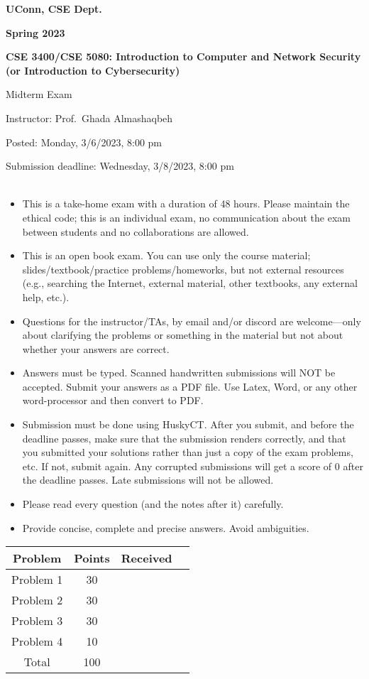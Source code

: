 \documentclass[12pt]{article}
\newcommand{\handout}[2]{
\renewcommand{\thepage}{\footnotesize CSE 3400/CSE 5850, #1, p. \arabic{page}}
\begin{center}

\noindent
{\bf UConn, CSE Dept.}

\noindent
{\bf Spring 2023}

\noindent
{\bf CSE 3400/CSE 5080: Introduction to Computer and Network Security \\(or Introduction to Cybersecurity)}
\end{center}

\begin{center}
{\Large #1}
\end{center}
}
\begin{document}
\handout{Midterm Exam}{}

\noindent
{Instructor: Prof.~Ghada Almashaqbeh}

\noindent
{Posted: Monday, 3/6/2023, 8:00 pm}

\noindent
{Submission deadline: Wednesday, 3/8/2023, 8:00 pm} \\\\

\begin{itemize}
    \item This is a take-home exam with a duration of 48 hours. Please maintain the ethical code; this is an individual exam, no communication about the exam between students and no collaborations are allowed.
    \item This is an open book exam. You can use only the course material; slides/textbook/practice problems/homeworks, but not external resources (e.g., searching the Internet, external material, other textbooks, any external help, etc.).
    \item Questions for the instructor/TAs, by email and/or discord are welcome---only about clarifying the problems or something in the material but not about whether your answers are correct.
    \item Answers must be typed. Scanned handwritten submissions will NOT be accepted. Submit your answers as a PDF file. Use Latex, Word, or any other word-processor and then convert to PDF. 
    \item Submission must be done using HuskyCT.  After you submit, and before the deadline passes, make sure that the submission renders correctly, and that you submitted your solutions rather than just a copy of the exam problems, etc. If not, submit again. Any corrupted submissions will get a score of 0 after the deadline passes. Late submissions will not be allowed.
    \item Please read every question (and the notes after it) carefully.
    \item Provide concise, complete and precise answers. Avoid ambiguities.
     
\end{itemize}
\bigskip

\begin{center}
\renewcommand{\arraystretch}{1.6}
 \begin{tabular}{|| c | c | c | c ||} 
 \hline\hline
 Problem & Points & Received  \\ 
 \hline\hline
 Problem 1 & 30 &  \\ 
 \hline
 Problem 2 & 30 &  \\
 \hline
 Problem 3 & 30 &  \\
 \hline
 Problem 4 & 10 &  \\
 \hline
 \hline
 Total & 100 &  \\ [1ex]
 \hline\hline
\end{tabular}
\end{center}
\end{document}
